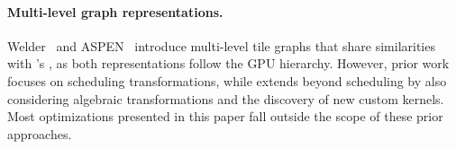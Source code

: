 \paragraph{Multi-level graph representations.} Welder~\cite{shi2023welder} and ASPEN~\cite{park2023aspen} introduce multi-level tile graphs that share similarities with \sys's \graphs, as both representations follow the GPU hierarchy. However, prior work focuses on scheduling transformations, while \sys extends beyond scheduling by also considering algebraic transformations and the discovery of new custom kernels. Most optimizations presented in this paper fall outside the scope of these prior approaches.

